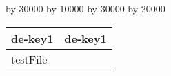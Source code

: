 
\begin{table}[htb]
\centering

\ifthenelse{\isundefined{\tabLenA}}{\newlength{\tabLenA}}{}
\ifthenelse{\isundefined{\tabLenB}}{\newlength{\tabLenB}}{}

\setlength{\tabLenA}{\textwidth}
\setlength{\tabLenB}{\textwidth}

\divide\tabLenA by 30000
\multiply\tabLenA by 10000
\divide\tabLenB by 30000
\multiply\tabLenB by 20000
\begin{tabular}{|p{\tabLenA}|p{\tabLenB}|}
\hline

de-key1
&

de-key1
\\
\hline
\hline

testFile
\\
\hline
\end{tabular}
\end{table}
